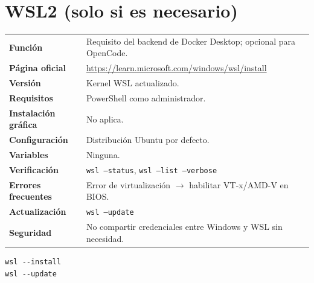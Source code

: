 \section{WSL2 (solo si es necesario)}
{\small\begin{tabularx}{\linewidth}{@{}>{\bfseries}p{2.9cm}X@{}}\toprule
Función & Requisito del backend de Docker Desktop; opcional para OpenCode.\\
Página oficial & \url{https://learn.microsoft.com/windows/wsl/install}\\
Versión & Kernel WSL actualizado.\\
Requisitos & PowerShell como administrador.\\
Instalación gráfica & No aplica.\\
Configuración & Distribución Ubuntu por defecto.\\
Variables & Ninguna.\\
Verificación & \texttt{wsl --status}, \texttt{wsl --list --verbose}\\
Errores frecuentes & Error de virtualización $\rightarrow$ habilitar VT-x/AMD-V en BIOS.\\
Actualización & \texttt{wsl --update}\\
Seguridad & No compartir credenciales entre Windows y WSL sin necesidad.\\
\bottomrule\end{tabularx}}
\begin{lstlisting}[style=ps]
wsl --install
wsl --update
\end{lstlisting}

